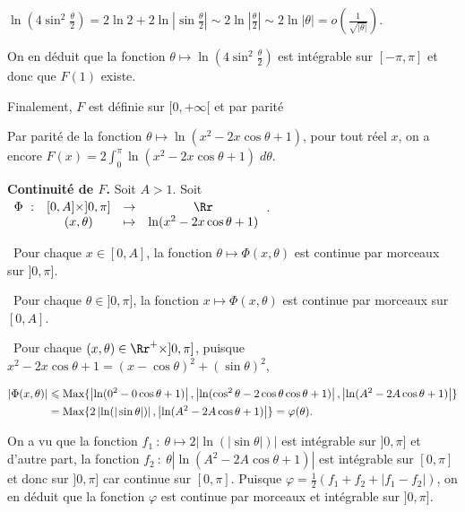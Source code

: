 {\begin{enumerate}
{\begin{center}
$\ln\left(4\sin^2\frac{\theta}{2}\right)=2\ln2+2\ln\left|\sin\frac{\theta}{2}\right|\sim2\ln\left|\frac{\theta}{2}\right|\sim2\ln|\theta|=o\left(\frac{1}{\sqrt{|\theta|}}\right)$.
\end{center}

On en déduit que la fonction $\theta\mapsto\ln\left(4\sin^2\frac{\theta}{2}\right)$ est intégrable sur $[-\pi,\pi]$ et donc que $F(1)$ existe.

Finalement, $F$ est définie sur $[0,+\infty[$ et par parité

\begin{center}
\end{center}

 Par parité de la fonction $\theta\mapsto\ln(x^2-2x\cos\theta+1)$, pour tout réel $x$, on a encore $F(x)=2\int_{0}^{\pi}\ln(x^2-2x\cos\theta+1)\;d\theta$.

\textbf{Continuité de $F$.} Soit $A>1$. Soit $\begin{array}[t]{cccc}
\Phi~:&[0,A]\times]0,\pi]&\rightarrow&\Rr\\
 &(x,\theta)&\mapsto&\ln(x^2-2x\cos\theta+1)
\end{array}$.

\textbullet~Pour chaque $x\in[0,A]$, la fonction $\theta\mapsto\Phi(x,\theta)$ est continue par morceaux sur $]0,\pi]$.

\textbullet~Pour chaque $\theta\in]0,\pi]$, la fonction $x\mapsto\Phi(x,\theta)$ est continue par morceaux sur $[0,A]$.

\textbullet~Pour chaque $(x,\theta)\in\Rr^+\times]0,\pi]$, puisque $x^2-2x\cos\theta+1=(x-\cos\theta)^2+(\sin\theta)^2$,

\begin{align*}\ensuremath
|\Phi(x,\theta)|&\leqslant\text{Max}\{\left|\ln(0^2-0\cos\theta+1)\right|,\left|\ln(\cos^2\theta-2\cos\theta\cos\theta+1)\right|,\left|\ln(A^2-2A\cos\theta+1)\right|\}\\
 &=\text{Max}\{2\left|\ln(|\sin\theta|)\right|,\left|\ln(A^2-2A\cos\theta+1)\right|\}=\varphi(\theta).
\end{align*}

On a vu que la fonction $f_1~:~\theta\mapsto2\left|\ln(|\sin\theta|)\right|$ est intégrable sur $]0,\pi]$ et d'autre part, la fonction $f_2~:~\theta\left|\ln(A^2-2A\cos\theta+1)\right|$ est intégrable sur $[0,\pi]$ et donc sur $]0,\pi]$ car continue sur $[0,\pi]$. Puisque $\varphi=\frac{1}{2}(f_1+f_2+|f_1-f_2|)$, on en déduit que la fonction $\varphi$ est continue par morceaux et intégrable sur $]0,\pi]$.

}
\end{enumerate}}

